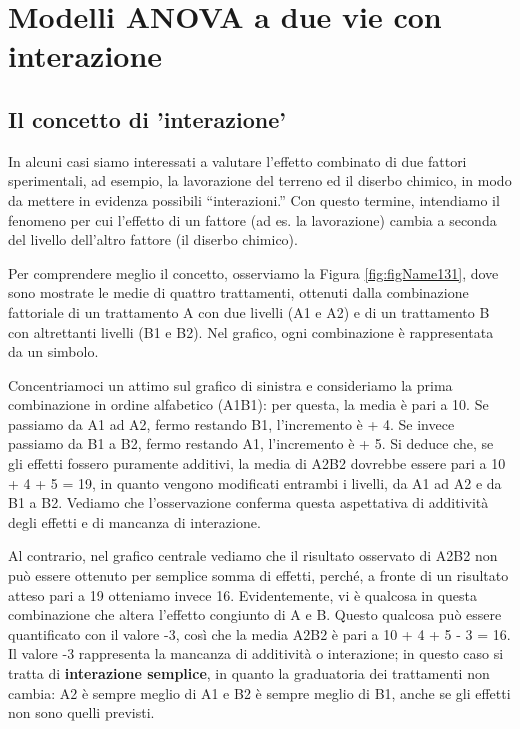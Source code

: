 \documentclass[a4paper,12pt,oneside]{book}
\begin{document}
\hypertarget{modelli-anova-a-due-vie-con-interazione}{%
\chapter{Modelli ANOVA a due vie con interazione}\label{modelli-anova-a-due-vie-con-interazione}}

\hypertarget{il-concetto-di-interazione}{%
\section{Il concetto di 'interazione'}\label{il-concetto-di-interazione}}

In alcuni casi siamo interessati a valutare l'effetto combinato di due fattori sperimentali, ad esempio, la lavorazione del terreno ed il diserbo chimico, in modo da mettere in evidenza possibili ``interazioni.'' Con questo termine, intendiamo il fenomeno per cui l'effetto di un fattore (ad es. la lavorazione) cambia a seconda del livello dell'altro fattore (il diserbo chimico).

Per comprendere meglio il concetto, osserviamo la Figura \ref{fig:figName131}, dove sono mostrate le medie di quattro trattamenti, ottenuti dalla combinazione fattoriale di un trattamento A con due livelli (A1 e A2) e di un trattamento B con altrettanti livelli (B1 e B2). Nel grafico, ogni combinazione è rappresentata da un simbolo.

Concentriamoci un attimo sul grafico di sinistra e consideriamo la prima combinazione in ordine alfabetico (A1B1): per questa, la media è pari a 10. Se passiamo da A1 ad A2, fermo restando B1, l'incremento è + 4. Se invece passiamo da B1 a B2, fermo restando A1, l'incremento è + 5. Si deduce che, se gli effetti fossero puramente additivi, la media di A2B2 dovrebbe essere pari a 10 + 4 + 5 = 19, in quanto vengono modificati entrambi i livelli, da A1 ad A2 e da B1 a B2. Vediamo che l'osservazione conferma questa aspettativa di additività degli effetti e di mancanza di interazione.

Al contrario, nel grafico centrale vediamo che il risultato osservato di A2B2 non può essere ottenuto per semplice somma di effetti, perché, a fronte di un risultato atteso pari a 19 otteniamo invece 16. Evidentemente, vi è qualcosa in questa combinazione che altera l'effetto congiunto di A e B. Questo qualcosa può essere quantificato con il valore -3, così che la media A2B2 è pari a 10 + 4 + 5 - 3 = 16. Il valore -3 rappresenta la mancanza di additività o interazione; in questo caso si tratta di \textbf{interazione semplice}, in quanto la graduatoria dei trattamenti non cambia: A2 è sempre meglio di A1 e B2 è sempre meglio di B1, anche se gli effetti non sono quelli previsti.
\end{document}

